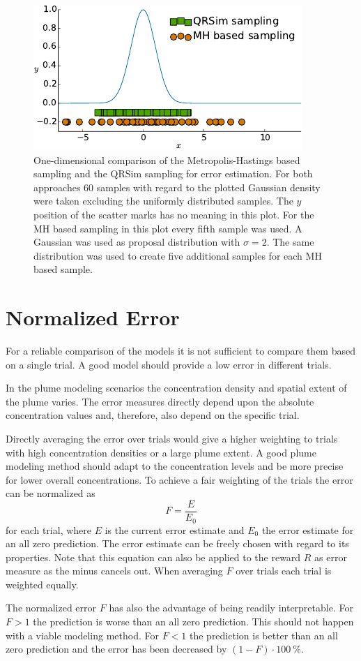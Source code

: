 \begin{figure}
    \centering
    \includegraphics{plots/err-sampling}
    \caption[Comparison of error estimation sampling methods]{One-dimensional 
        comparison of the Metropolis-Hastings based sampling and the QRSim 
        sampling for error estimation. For both approaches 60 samples with 
        regard to the plotted Gaussian density were taken excluding the 
        uniformly distributed samples.  The $y$ position of the scatter marks 
        has no meaning in this plot. For the MH based sampling in this plot 
        every fifth sample was used.  A Gaussian was used as proposal 
        distribution with $\sigma = 2$.  The same distribution was used to 
        create five additional samples for each MH based 
        sample.}\label{fig:err-sampling}
\end{figure}

\section{Normalized Error}
For a reliable comparison of the models it is not sufficient to compare them 
based on a single trial. A good model should provide a low error in different 
trials.

In the plume modeling scenarios the concentration density and spatial extent of 
the plume varies. The error measures directly depend upon the absolute 
concentration values and, therefore, also depend on the specific trial.

Directly averaging the error over trials would give a higher weighting to trials 
with high concentration densities or a large plume extent. A good plume 
modeling method should adapt to the concentration levels and be more precise 
for lower overall concentrations. To achieve a fair weighting of the trials the 
error can be normalized as
\begin{equation}
    F = \frac{E}{E_0}
\end{equation}
for each trial, where $E$ is the current error estimate and $E_0$ the error 
estimate for an all zero prediction. The error estimate can be freely chosen 
with regard to its properties. Note that this equation can also be applied to 
the reward $R$ as error measure as the minus cancels out. When averaging $F$ 
over trials each trial is weighted equally.

The normalized error $F$ has also the advantage of being readily interpretable.  
For $F > 1$ the prediction is worse than an all zero prediction.  This should 
not happen with a viable modeling method. For $F < 1$ the prediction is better 
than an all zero prediction and the error has been decreased by $(1 - F) \cdot 
\SI{100}{\percent}$.
